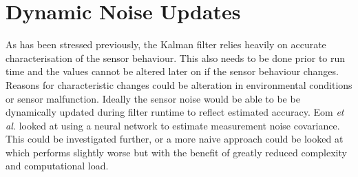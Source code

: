 \section{Dynamic Noise Updates}
As has been stressed previously, the Kalman filter relies heavily on accurate characterisation of the sensor behaviour. This also needs to be done prior to run time and the values cannot be altered later on if the sensor behaviour changes. Reasons for characteristic changes could be alteration in environmental conditions or sensor malfunction. Ideally the sensor noise would be able to be be dynamically updated during filter runtime to reflect estimated accuracy. Eom \textit{et al.} \cite{eom2011improved} looked at using a neural network to estimate measurement noise covariance. This could be investigated further,  or a more naive approach could be looked at which performs slightly worse but with the benefit of greatly reduced complexity and computational load.
